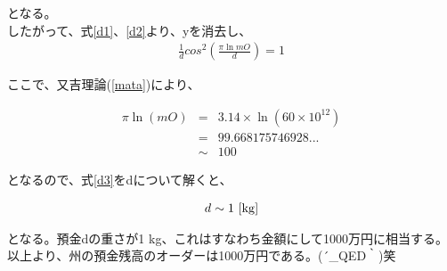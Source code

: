 となる。\\
したがって、式\ref{d1}、\ref{d2}より、yを消去し、
\begin{eqnarray}
 \frac{1}{d}cos^2(\frac{\pi \ln mO}{d}) =1
 \label{d3}
\end{eqnarray}

ここで、又吉理論(\ref{mata})により、

\begin{eqnarray}
 \pi \ln (mO) &=& 3.14\times \ln (60\times10^{12})\nonumber\\
 &=&99.668175746928...\nonumber\\
 &\sim&100
\end{eqnarray}

となるので、式\ref{d3}をdについて解くと、

\begin{eqnarray}
d \sim 1 \ [\rm{kg}]
\end{eqnarray}

となる。預金dの重さが1 kg、これはすなわち金額にして1000万円に相当する。\\
\large{以上より、州の預金残高のオーダーは1000万円である。\sf(´\_QED｀)笑}


